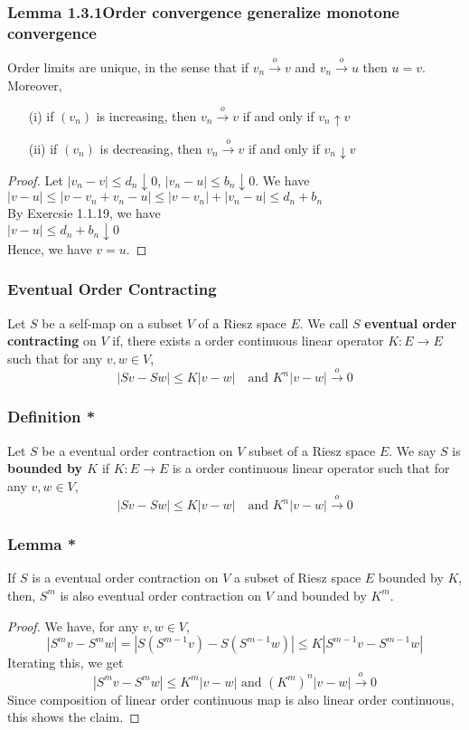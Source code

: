 \documentclass[11pt,xcolor={dvipsnames},hyperref={pdftex,pdfpagemode=UseNone,hidelinks,pdfdisplaydoctitle=true},usepdftitle=false]{beamer}
\newcommand{\too}{\stackrel { o } {\to} }
\begin{document}
\begin{frame}
\frametitle{Lemma 1.3.1Order convergence generalize monotone convergence}
Order limits are unique, in the sense that if $v_n\too v$ and $v_n\too u$ then $u=v$. Moreover,
\begin{enumerate}
\item[(i)] if $(v_n)$ is increasing, then $v_n\too v$ if and only if $v_n\uparrow v$
\item[(ii)] if $(v_n)$ is decreasing, then $v_n\too v$ if and only if $v_n\downarrow v$
\end{enumerate} 
\begin{proof}
Let $|v_n-v|\le d_n\downarrow 0$, $|v_n-u|\le b_n\downarrow 0$. We have\\
$
|v-u|\le |v-v_n+v_n-u| \le |v-v_n| + |v_n-u|\le d_n+b_n
$\\
By Exercsie 1.1.19, we have\\
$
|v-u|\le d_n+b_n\downarrow 0
$\\
Hence, we have $v=u$.
\end{proof}
\end{frame}
\begin{frame}
\end{frame}
\begin{frame}
\frametitle{Eventual Order Contracting}
\begin{definition}
Let $S$ be a self-map on a subset $V$ of a Riesz space $E$. We call $S$ \textbf{eventual order contracting} on $V$ if, there exists a order continuous linear operator $K:E\to E$ such that for any $v,w\in V$,
\begin{equation*}
|Sv-Sw|\le K|v-w|\quad\text{and $K^n|v-w|\too 0$}
\end{equation*}
\end{definition}
\end{frame}
\begin{frame}
\frametitle{Definition *}
\begin{definition}
Let $S$ be a eventual order contraction on $V$ subset of a Riesz space $E$. We say $S$ is \textbf{bounded by $K$} if $K:E\to E$ is a order continuous linear operator such that for any $v,w\in V$,
\begin{equation*}
|Sv-Sw|\le K|v-w|\quad\text{and $K^n|v-w|\too 0$}
\end{equation*}
\end{definition}
\end{frame}

\begin{frame}
\frametitle{Lemma *}

If $S$ is a eventual order contraction on $V$ a subset of Riesz space $E$ bounded by $K$, then, $S^m$ is also eventual order contraction on $V$ and bounded by $K^m$.
\begin{proof}
We have, for any $v,w\in V$,
$$
|S^m v-S^mw| = |S(S^{m-1}v)-S(S^{m-1}w)|\le K|S^{m-1} v-S^{m-1}w|
$$
Iterating this, we get 
$$
|S^mv-S^mw|\le K^m|v-w| \text{ and $(K^m)^n|v-w|\too 0$}
$$
Since composition of linear order continuous map is also linear order continuous, this shows the claim.
\end{proof}
\end{frame}
\end{document}
